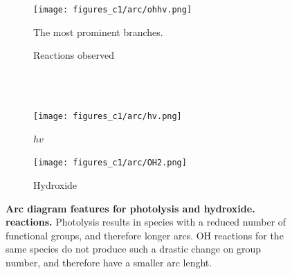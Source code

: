 \begin{figure}[H]
     \centering
      \begin{subfigure}[b]{.4\textwidth}
         \centering
         \texttt{[image: figures\_c1/arc/ohhv.png]}
         \caption{The most prominent branches. }
         \label{fig:ohhv}
     \end{subfigure}
      \begin{subfigure}[b]{.4\textwidth}
         \centering
    \hfill
         \caption{Reactions observed}
         \label{fig:rxnohhv}
     \end{subfigure}
     \\ \ \\
     \begin{subfigure}[b]{.4\textwidth}
         \centering
         \texttt{[image: figures\_c1/arc/hv.png]}
         \caption{$hv$}
         \label{fig:hv}
     \end{subfigure}
     \begin{subfigure}[b]{.4\textwidth}
         \centering
         \texttt{[image: figures\_c1/arc/OH2.png]}
         \caption{Hydroxide}
         \label{fig:oh2}
     \end{subfigure}
      \caption{\textbf{ Arc diagram features for photolysis and  hydroxide. reactions.  } Photolysis results in species with a reduced number of functional groups, and therefore longer arcs. OH reactions for the same species do not produce such a drastic change on group number, and therefore have a smaller arc lenght.}
        \label{fig:wholeohhv}
\end{figure}



